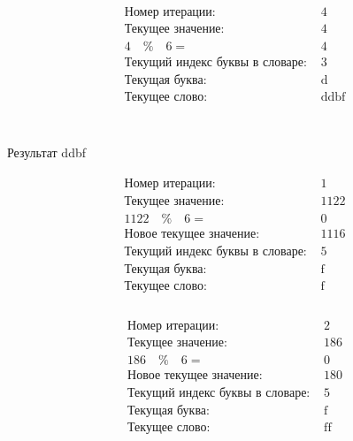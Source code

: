 \documentclass[letterpaper, 11pt]{extarticle}
\begin{document}
\begin{multicols}{2}
    \begin{align*}
        \begin{aligned}
            & \text{Номер итерации: }&4\\
            & \text{Текущее значение: }&4\\
            & 4 \quad \% \quad 6 =& 4 \\
            & \text{Текущий индекс буквы в словаре: }&3\\
            & \text{Текущая буква: }& \text{d}\\
            & \text{Текущее слово: }& \text{ddbf}\\
        \end{aligned}
    \end{align*}\\
    
    \begin{center}
        Результат \guillemotleft ddbf\guillemotright\\
    \end{center}

    \columnbreak

    \begin{align*}
        \begin{aligned}
            & \text{Номер итерации: }&1\\
            & \text{Текущее значение: }&1122\\
            & 1122 \quad \% \quad 6 =& 0 \\
            & \text{Новое текущее значение: }&1116\\
            & \text{Текущий индекс буквы в словаре: }&5\\
            & \text{Текущая буква: }& \text{f}\\
            & \text{Текущее слово: }& \text{f}\\
        \end{aligned}
    \end{align*}

    \begin{align*}
        \begin{aligned}
            & \text{Номер итерации: }&2\\
            & \text{Текущее значение: }&186\\
            & 186 \quad \% \quad 6 =& 0 \\
            & \text{Новое текущее значение: }&180\\
            & \text{Текущий индекс буквы в словаре: }&5\\
            & \text{Текущая буква: }& \text{f}\\
            & \text{Текущее слово: }& \text{ff}\\
        \end{aligned}
    \end{align*}
    

\end{multicols}
\end{document}
